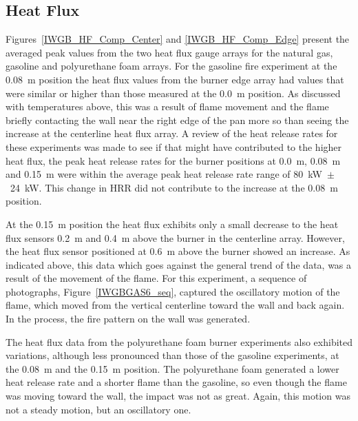 \documentclass[twoside]{uocthesis}
\begin{document}
{\subsection{Heat Flux}

Figures~\ref{IWGB_HF_Comp_Center} and \ref{IWGB_HF_Comp_Edge} present the averaged peak values from the two heat flux gauge arrays for the natural gas, gasoline and polyurethane foam arrays.  For the gasoline fire experiment at the 0.08~m position the heat flux values from the burner edge array had values that were similar or higher than those measured at the 0.0~m position. As discussed with temperatures above, this was a result of flame movement and the flame briefly contacting the wall near the right edge of the pan more so than seeing the increase at the centerline heat flux array.  A review of the heat release rates for these experiments was made to see if that might have contributed to the higher heat flux, the peak heat release rates for the burner positions at 0.0~m, 0.08~m and 0.15~m were within the average peak heat release rate range of 80~kW~$\pm$~24~kW.  This change in HRR did not contribute to the increase at the 0.08~m position.  

At the 0.15~m position the heat flux exhibits only a small decrease to the heat flux sensors 0.2~m and 0.4~m above the burner in the centerline array.  However, the heat flux sensor positioned at 0.6~m above the burner showed an increase.  As indicated above, this data which goes against the general trend of the data, was a result of the movement of the flame.  For this experiment, a sequence of photographs, Figure~\ref{IWGBGAS6_seq}, captured the oscillatory motion of the flame, which moved from the vertical centerline toward the wall and back again.  In the process, the fire pattern on the wall was generated.    

The heat flux data from the polyurethane foam burner experiments also exhibited variations, although less pronounced than those of the gasoline experiments, at the 0.08~m and the 0.15~m position.  The polyurethane foam generated a lower heat release rate and a shorter flame than the gasoline, so even though the flame was moving toward the wall, the impact was not as great.  Again, this motion was not a steady motion, but an oscillatory one.      

}
\end{document}

